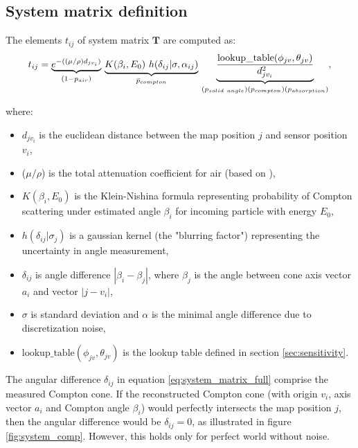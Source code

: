 \subsection{System matrix definition}
The elements $t_{ij}$ of system matrix $\mathbf{T}$ are computed as:
\begin{equation}
  t_{ij} = \underset{(1-p_{air})}{\underbrace{e^{-((\mu/\rho) d_{jv_{i}})}}}\ 
  \underset{\bar{p}_{compton}} {  \underbrace{K(\beta_{i}, E_{0})\ h(\delta_{ij}|\sigma, \alpha_{ij})}} \
  \underset{(p_{solid\ angle})\\(p_{compton})\\(p_{absorption})} {\underbrace{\frac{\mathrm{lookup\_table}(\phi_{jv}, \theta_{jv})}{d_{jv_{i}}^{2}}}}
  ,%
  \label{eq:system_matrix_full}
\end{equation}

where:
\begin{itemize}
 \item $d_{jv_{i}}$ is the euclidean distance between the map position $j$ and sensor position $v_{i}$, 
\item ($\mu/\rho$) is the total attenuation coefficient for air (based on \cite{nist}),
\item $K(\beta_{i}, E_{0})$ is the Klein-Nishina formula representing probability of Compton scattering under estimated angle $\beta_{i}$ for incoming particle with energy $E_{0}$,
\item $h(\delta_{ij}|\sigma_{j})$ is a gaussian kernel (the "blurring factor") representing the uncertainty in angle measurement,
\item $\delta_{ij}$ is angle difference $|\beta_{i}-\beta_{j}|$, where $\beta_{j}$ is the angle between cone axis vector $a_{i}$ and vector $|j-v_{i}|$, 
\item $\sigma$ is standard deviation and $\alpha$ is the minimal angle difference due to discretization noise,
\item $\mathrm{lookup\_table}(\phi_{jv}, \theta_{jv})$ is the lookup table defined in section \ref{sec:sensitivity}.
\end{itemize}

The angular difference $\delta_{ij}$ in equation \ref{eq:system_matrix_full} comprise the measured Compton cone.
If the reconstructed Compton cone (with origin $v_{i}$, axis vector $a_{i}$ and Compton angle $\beta_{i}$) would perfectly intersects the map position $j$, then the angular difference would be $\delta_{ij} = 0$, as illustrated in figure \ref{fig:system_comp}.
However, this holds only for perfect world without noise.

